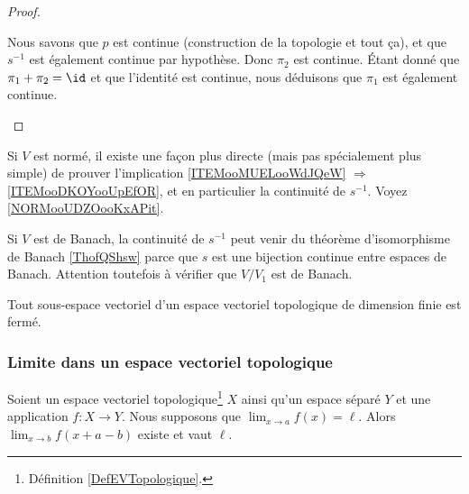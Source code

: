 \begin{proof}
\begin{subproof}
		Nous savons que \( p\) est continue (construction de la topologie et tout ça), et que \( s^{-1}\) est également continue par hypothèse. Donc \( \pi_2\) est continue. Étant donné que \( \pi_1+\pi_2=\id\) et que l'identité est continue, nous déduisons que \( \pi_1\) est également continue.
	\end{subproof}
\end{proof}


\begin{normaltext}
	Si \( V\) est normé, il existe une façon plus directe (mais pas spécialement plus simple) de prouver l'implication \ref{ITEMooMUELooWdJQeW} \( \Rightarrow\) \ref{ITEMooDKOYooUpEfOR}, et en particulier la continuité de \( s^{-1}\). Voyez \ref{NORMooUDZOooKxAPit}.

	Si \( V\) est de Banach, la continuité de \( s^{-1}\) peut venir du théorème d'isomorphisme de Banach \ref{ThofQShsw} parce que \( s\) est une bijection continue entre espaces de Banach. Attention toutefois à vérifier que \( V/V_1\) est de Banach.
\end{normaltext}


\begin{corollary}	\label{CORooJHSGooUkGepQ}
	Tout sous-espace vectoriel d'un espace vectoriel topologique de dimension finie est fermé.
\end{corollary}


\subsubsection{Limite dans un espace vectoriel topologique}


\begin{lemma}      \label{LEMooAHIGooJhpPvo}
	Soient un espace vectoriel topologique\footnote{Définition \ref{DefEVTopologique}.} \( X\) ainsi qu'un espace séparé \( Y\) et une application \( f\colon X\to Y\). Nous supposons que \( \lim_{x\to a}f(x)=\ell\). Alors \( \lim_{x\to b} f(x+a-b)\) existe et vaut \( \ell\).
\end{lemma}

